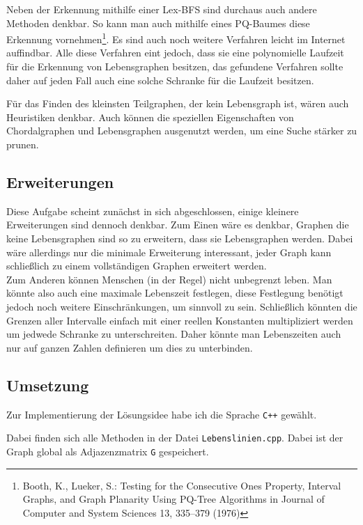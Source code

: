 Neben der Erkennung mithilfe einer Lex-BFS sind durchaus auch andere Methoden denkbar. So kann man auch mithilfe eines PQ-Baumes diese Erkennung vornehmen\footnote{Booth, K., Lueker, S.: Testing for the Consecutive Ones Property, Interval Graphs, and Graph Planarity Using PQ-Tree Algorithms in Journal of Computer and System Sciences 13, 335--379 (1976)}. Es sind auch noch weitere Verfahren leicht im Internet auffindbar. Alle diese Verfahren eint jedoch, dass sie eine polynomielle Laufzeit für die Erkennung von Lebensgraphen besitzen, das gefundene Verfahren sollte daher auf jeden Fall auch eine solche Schranke für die Laufzeit besitzen.

Für das Finden des kleinsten Teilgraphen, der kein Lebensgraph ist, wären auch Heuristiken denkbar. Auch können die speziellen Eigenschaften von Chordalgraphen und Lebensgraphen ausgenutzt werden, um eine Suche stärker zu prunen.

\subsection{Erweiterungen}

Diese Aufgabe scheint zunächst in sich abgeschlossen, einige kleinere  Erweiterungen sind dennoch denkbar. Zum Einen wäre es denkbar, Graphen die keine Lebensgraphen sind so zu erweitern, dass sie Lebensgraphen werden. Dabei wäre allerdings nur die minimale Erweiterung interessant, jeder Graph kann schließlich zu einem vollständigen Graphen erweitert werden.\\
Zum Anderen können Menschen (in der Regel) nicht unbegrenzt leben. Man könnte also auch eine maximale Lebenszeit festlegen, diese Festlegung benötigt jedoch noch weitere Einschränkungen, um sinnvoll zu sein. Schließlich könnten die Grenzen aller Intervalle einfach mit einer reellen Konstanten multipliziert werden um jedwede Schranke zu unterschreiten. Daher könnte man Lebenszeiten auch nur auf ganzen Zahlen definieren um dies zu unterbinden.

\subsection{Umsetzung}

Zur Implementierung der Lösungsidee habe ich die Sprache \texttt{C++} gewählt.

Dabei finden sich alle Methoden in der Datei \texttt{Lebenslinien.cpp}. Dabei ist der Graph global als Adjazenzmatrix \texttt{G} gespeichert.

